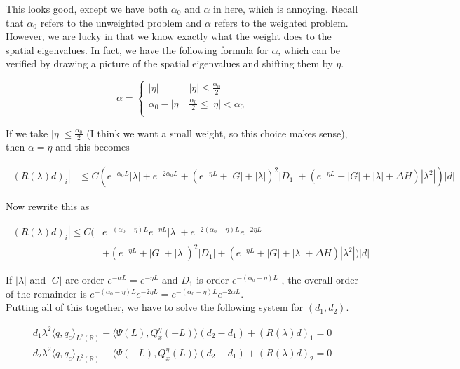 \documentclass[12pt]{article}
\def\R{{\mathbb R}}
\begin{document}
This looks good, except we have both $\alpha_0$ and $\alpha$ in here, which is annoying. Recall that $\alpha_0$ refers to the unweighted problem and $\alpha$ refers to the weighted problem. However, we are lucky in that we know exactly what the weight does to the spatial eigenvalues. In fact, we have the following formula for $\alpha$, which can be verified by drawing a picture of the spatial eigenvalues and shifting them by $\eta$.

\begin{equation}
\alpha = \begin{cases}
|\eta| & |\eta| \leq \frac{\alpha_0}{2} \\
\alpha_0 - |\eta| & \frac{\alpha_0}{2} \leq |\eta| < \alpha_0 \\
\end{cases}
\end{equation}

If we take $|\eta| \leq \frac{\alpha_0}{2}$ (I think we want a small weight, so this choice makes sense), then $\alpha = \eta$ and this becomes

\begin{align*}
|(R(\lambda)d)_i| &\leq C \left( e^{-\alpha_0 L}|\lambda| + e^{-2\alpha_0 L} + (e^{-\eta L} + |G| + |\lambda|)^2 |D_1| + (e^{-\eta L} + |G| + |\lambda| + \Delta H )|\lambda^2| \right)|d|
\end{align*}

Now rewrite this as

\begin{align*}
|(R(\lambda)d)_i| \leq C ( &e^{-(\alpha_0 - \eta) L}e^{-\eta L}|\lambda| + e^{-2(\alpha_0 - \eta) L}e^{-2\eta L} \\
&+ (e^{-\eta L} + |G| + |\lambda|)^2 |D_1| + (e^{-\eta L} + |G| + |\lambda| + \Delta H )|\lambda^2| ) |d|
\end{align*}

If $|\lambda|$ and $|G|$ are order $e^{-\alpha L} = e^{-\eta L}$ and $D_1$ is order $e^{-(\alpha_0 - \eta) L}$ , the overall order of the remainder is $e^{-(\alpha_0 - \eta) L} e^{-2 \eta L} = e^{-(\alpha_0 - \eta) L} e^{-2 \alpha L} $.\\

Putting all of this together, we have to solve the following system for $(d_1, d_2)$.

\begin{align*}
d_1 \lambda^2 \langle q, q_c \rangle_{L^2(\R)} - \langle \Psi(L), Q^\eta_x(-L) \rangle (d_2 - d_1)  + (R(\lambda)d)_1 = 0\\
d_2 \lambda^2 \langle q, q_c \rangle_{L^2(\R)} - \langle \Psi(-L), Q^\eta_x(L) \rangle (d_2 - d_1)  + (R(\lambda)d)_2 = 0
\end{align*}
\end{document}
